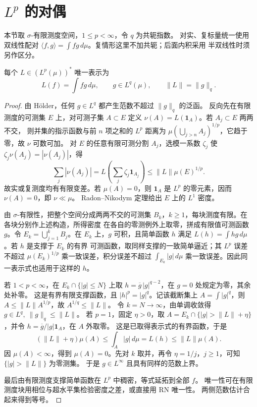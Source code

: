 \section{\texorpdfstring{\(L^p\)}{Lp} 的对偶}

本节取 \(\sigma\)-有限测度空间，\(1\le p<\infty\)，令 \(q\) 为共轭指数。
对实、复标量统一使用双线性配对
\(\langle f,g\rangle=\int fg\,d\mu\)。复情形这里不加共轭；后面内积采用
半双线性时须另作区分。

\begin{theorem}\label{thm:lp-duality}
每个 \(L\in(L^p(\mu))^*\) 唯一表示为
\[
 L(f)=\int fg\,d\mu,\qquad g\in L^q(\mu),\qquad \|L\|=\|g\|_q.
\]
\end{theorem}
\begin{proof}
由 Hölder，任何 \(g\in L^q\) 都产生范数不超过 \(\|g\|_q\) 的泛函。
反向先在有限测度的可测集 \(E\) 上，对可测子集 \(A\subset E\)
定义 \(\nu(A)=L(\mathbf1_A)\)。若 \(A_j\subset E\) 两两不交，
则并集的指示函数与前 \(n\) 项之和的 \(L^p\) 距离为
\(\mu(\bigcup_{j>n}A_j)^{1/p}\)，它趋于零，故 \(\nu\) 可数可加。
对 \(E\) 的任意有限可测分割 \(A_j\)，选模一系数 \(\zeta_j\) 使
\(\zeta_j\nu(A_j)=|\nu(A_j)|\)，得
\[
 \sum_j|\nu(A_j)|
 =L\left(\sum_j\zeta_j\mathbf1_{A_j}\right)
 \le\|L\|\mu(E)^{1/p}.
\]
故实或复测度均有有限变差。若 \(\mu(A)=0\)，则 \(\mathbf1_A\) 是
\(L^p\) 的零元素，因而 \(\nu(A)=0\)，即 \(\nu\ll\mu\)。
Radon--Nikodym 定理给出 \(E\) 上的 \(L^1\) 密度。

由 \(\sigma\)-有限性，把整个空间分成两两不交的可测集
\(B_k\)，\(k\ge1\)，每块测度有限。在各块分别作上述构造，所得密度
在各自的零测例外上取零，拼成有限值可测函数 \(g\)。令
\(E_k=\bigcup_{j=1}^k B_j\)。在 \(E_k\) 上，\(g\) 可积，且简单函数
\(h\) 满足 \(L(h)=\int hg\,d\mu\)。若 \(h\) 是支撑于 \(E_k\) 的有界
可测函数，取同样支撑的一致简单逼近；其 \(L^p\) 误差不超过
\(\mu(E_k)^{1/p}\) 乘一致误差，积分误差不超过
\(\int_{E_k}|g|\,d\mu\) 乘一致误差。因此同一表示式也适用于这样的 \(h\)。

若 \(1<p<\infty\)，在 \(E_k\cap\{|g|\le N\}\) 上取
\(h=\overline g\,|g|^{q-2}\)，在 \(g=0\) 处规定为零，其余处补零。
这是有界有限支撑函数，且 \(|h|^p=|g|^q\)。记该截断集上
\(A=\int|g|^q\)，则 \(A\le\|L\|A^{1/p}\)，故 \(A^{1/q}\le\|L\|\)。
令 \(k=N\to\infty\)，由单调收敛得 \(g\in L^q,\ \|g\|_q\le\|L\|\)。
若 \(p=1\)，固定 \(\eta>0\)，取
\(A=E_k\cap\{|g|>\|L\|+\eta\}\)，并令
\(h=\overline g/|g|\mathbf1_A\)，在 \(A\) 外取零。
这是已取得表示式的有界函数，于是
\[
 (\|L\|+\eta)\mu(A)\le \int_A|g|\,d\mu
 =L(h)\le\|L\|\mu(A).
\]
因 \(\mu(A)<\infty\)，得到 \(\mu(A)=0\)。先对 \(k\) 取并，再令
\(\eta=1/j\)，\(j\ge1\)，可知 \(\{|g|>\|L\|\}\) 为零测集。
于是 \(g\in L^\infty\) 且具有同样的范数上界。

最后由有限测度支撑简单函数在 \(L^p\) 中稠密，等式延拓到全部 \(f\)。
唯一性可在有限测度块用相位与超水平集检验密度之差，或直接用 RN 唯一性。
两侧范数估计合起来得到等号。
\end{proof}

